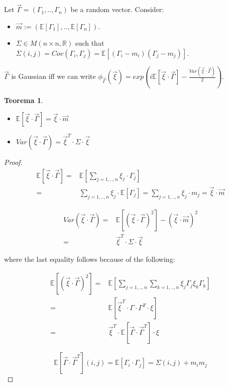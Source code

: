 \documentclass[11pt,a4paper]{article}
\newtheorem{theorem}{Teorema}
\theoremstyle{definition}
\theoremstyle{remark}
\begin{document}
Let $\vec{\Gamma} = (\Gamma_1,..,\Gamma_n)$ be a random vector. Consider:
\begin{itemize}
	\item	$\vec{m} := (\mathbb{E}[\Gamma_1],..,\mathbb{E}[\Gamma_n])$.
	\item	$\Sigma \in M(n \times n, \mathbb{R})$ such that $\Sigma(i,j) = Cov(\Gamma_i,\Gamma_j) = \mathbb{E}[(\Gamma_i - m_i)(\Gamma_j - m_j)]$.
\end{itemize}

$\vec{\Gamma}$ is Gaussian iff we can write 
$\phi_{\vec{\Gamma}}(\vec{\xi}) = exp(i \mathbb{E}[\vec{\xi} \cdot \vec{\Gamma}] - \frac{Var(\vec{\xi} \cdot \vec{\Gamma})}{2})$.

\begin{theorem}

	\begin{itemize}
		\item	$\mathbb{E}[\vec{\xi} \cdot \vec{\Gamma}] = \vec{\xi} \cdot \vec{m}$
		\item	$Var(\vec{\xi} \cdot \vec{\Gamma}) = \vec{\xi}^T \cdot \Sigma \cdot \vec{\xi}$
	\end{itemize}

\end{theorem}

\begin{proof}

	\begin{align*}
		\mathbb{E}[\vec{\xi} \cdot \vec{\Gamma}] =& \mathbb{E}[\sum_{j=1,..,n} \xi_j \cdot \Gamma_j] \\
		=& \sum_{j=1,..,n} \xi_j \cdot \mathbb{E}[\Gamma_j] = \sum_{j=1,..,n} \xi_j \cdot m_j = \vec{\xi} \cdot \vec{m}
	\end{align*}

	\begin{align*}
		Var(\vec{\xi} \cdot \vec{\Gamma}) =& \mathbb{E}[(\vec{\xi} \cdot \vec{\Gamma})^2] - (\vec{\xi} \cdot \vec{m})^2 \\
		=& \vec{\xi}^T \cdot \Sigma \cdot \vec{\xi}
	\end{align*}

	where the last equality follows because of the following:

	\begin{align*}
		\mathbb{E}[(\vec{\xi} \cdot \vec{\Gamma})^2] =& \mathbb{E}[\sum_{j=1,..,n} \sum_{k=1,..,n} \xi_j \Gamma_j \xi_k \Gamma_k] \\
		=& \mathbb{E}[\vec{\xi}^T \cdot \Gamma \cdot \Gamma^T \cdot \xi] \\
		=& \vec{\xi}^T \cdot \mathbb{E}[\vec{\Gamma} \cdot \vec{\Gamma}^T] \cdot \xi
	\end{align*}

	\[
		\mathbb{E}[\vec{\Gamma} \cdot \vec{\Gamma}^T ](i,j) = \mathbb{E}[\Gamma_i \cdot \Gamma_j] = \Sigma(i,j) + m_i m_j
	\]

\end{proof}
\end{document}
